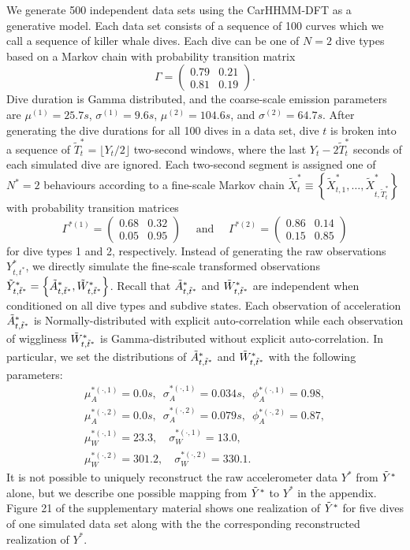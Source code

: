 We generate 500 independent data sets using the CarHHMM-DFT as a generative model. Each data set consists of a sequence of 100 curves which we call a sequence of killer whale dives. Each dive can be one of $N=2$ dive types based on a Markov chain with probability transition matrix
%
$$\Gamma = \begin{pmatrix} 0.79 & 0.21 \\ 0.81 & 0.19 \end{pmatrix}.$$
%
Dive duration is Gamma distributed, and the coarse-scale emission parameters are $\mu^{(1)} = 25.7s$, $\sigma^{(1)} = 9.6s$, $\mu^{(2)} = 104.6s$, and $\sigma^{(2)} = 64.7s$. After generating the dive durations for all 100 dives in a data set, dive $t$ is broken into a sequence of $\tilde T^*_t = \lfloor Y_t/2 \rfloor$ two-second windows, where the last $Y_t - 2 \tilde T^*_t$ seconds of each simulated dive are ignored. Each two-second segment is assigned one of $N^*=2$ behaviours according to a fine-scale Markov chain $\tilde X^*_t \equiv \left\{\tilde X^*_{t,1}, \ldots, \tilde X^*_{t,\tilde T^*_t} \right\}$ with probability transition matrices
%
$$\Gamma^{*(1)} = \begin{pmatrix} 0.68 & 0.32 \\ 0.05 & 0.95 \end{pmatrix} \quad \text{ and } \quad \Gamma^{*(2)} = \begin{pmatrix} 0.86 & 0.14 \\ 0.15 & 0.85 \end{pmatrix}$$ 
%
for dive types 1 and 2, respectively.
Instead of generating the raw observations $Y^*_{t,t^*}$, we directly simulate the fine-scale transformed observations $\tilde{Y}^*_{t,\tilde t^*} = \left\{\tilde{A}^*_{t,\tilde t^*}, \tilde{W}^*_{t,\tilde t^*}\right\}$. Recall that $\tilde{A}^*_{t,\tilde t^*}$ and $\tilde{W}^*_{t,\tilde t^*}$ are independent when conditioned on all dive types and subdive states. Each observation of acceleration $\tilde{A}^*_{t,\tilde t^*}$ is Normally-distributed with explicit auto-correlation while each observation of wiggliness $\tilde{W}^*_{t,\tilde t^*}$ is Gamma-distributed without explicit auto-correlation. In particular, we set the distributions of $\tilde{A}^*_{t,\tilde t^*}$ and $\tilde{W}^*_{t,\tilde t^*}$ with the following parameters:
%
\begin{gather*}
    \mu_A^{*(\cdot,1)} = 0.0 s, \enspace \sigma_A^{*(\cdot,1)} = 0.034s, \enspace \phi_A^{*(\cdot,1)} = 0.98, \\
    \mu_A^{*(\cdot,2)} = 0.0 s, \enspace \sigma_A^{*(\cdot,2)} = 0.079s, \enspace \phi_A^{*(\cdot,2)} = 0.87, \\
    \mu_W^{*(\cdot,1)} = 23.3, \quad \sigma_W^{*(\cdot,1)} = 13.0, \\
    \mu_W^{*(\cdot,2)} = 301.2, \quad \sigma_W^{*(\cdot,2)} = 330.1.
\end{gather*}
%
It is not possible to uniquely reconstruct the raw accelerometer data $Y^*$ from $\tilde{Y}^*$ alone, but we describe one possible mapping from $\tilde{Y}^*$ to $Y^*$ in the appendix. Figure 21 of the supplementary material shows one realization of $\tilde{Y}^*$ for five dives of one simulated data set along with the the corresponding reconstructed realization of $Y^*$. 

